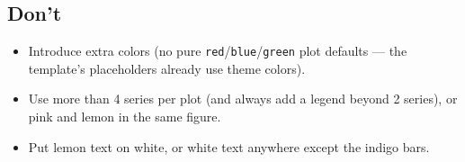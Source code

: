 \documentclass[a4paper,11pt]{article}
\begin{document}
\subsection*{Don't}
\begin{itemize}
\item Introduce extra colors (no pure \texttt{red}/\texttt{blue}/\texttt{green}
plot defaults — the template's placeholders already use theme colors).
\item Use more than 4 series per plot (and always add a legend beyond 2
series), or pink and lemon in the same figure.
\item Put lemon text on white, or white text anywhere except the indigo bars.
\end{itemize}
\end{document}
